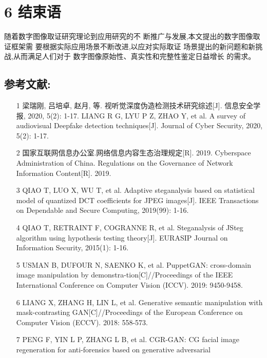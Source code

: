 \documentclass{article}
\begin{document}
\section{6 结束语}

随着数字图像取证研究理论到应用研究的不 断推广与发展,本文提出的数字图像取证框架需 要根据实际应用场景不断改进,以应对实际取证 场景提出的新问题和新挑战,从而满足人们对于 数字图像原始性、真实性和完整性鉴定日益增长 的需求。

\subsection{参考文献:}
\begin{itemize}
\item 
[1] 梁瑞刚, 吕培卓, 赵月, 等. 视听觉深度伪造检测技术研究综述[J]. 信息安全学报, 2020, 5(2): 1-17. LIANG R G, LYU P Z, ZHAO Y, et al. A survey of audiovisual
Deepfake detection techniques[J]. Journal of Cyber Security, 2020, 5(2): 1-17.

\item 
[2] 国家互联网信息办公室.网络信息内容生态治理规定[R]. 2019. Cyberspace Administration of China. Regulations on the Governance of Network Information Content[R]. 2019.

\item 
[3] QIAO T, LUO X, WU T, et al. Adaptive steganalysis based on statistical model of quantized DCT coefficients for JPEG images[J]. IEEE Transactions on Dependable and Secure Computing, 2019(99): 1-16.

\item 
[4] QIAO T, RETRAINT F, COGRANNE R, et al. Steganalysis of JSteg algorithm using hypothesis testing theory[J]. EURASIP Journal on Information Security, 2015(1): 1-16.

\item 
[5] USMAN B, DUFOUR N, SAENKO K, et al. PuppetGAN: cross-domain image manipulation by demonstra-tion[C]//Proceedings of the IEEE International Conference on Computer Vision (ICCV). 2019: 9450-9458.

\item 
[6] LIANG X, ZHANG H, LIN L, et al. Generative semantic manipulation with mask-contrasting GAN[C]//Proceedings of the European Conference on Computer Vision (ECCV). 2018: 558-573.

\item 
[7] PENG F, YIN L P, ZHANG L B, et al. CGR-GAN: CG facial image regeneration for anti-forensics based on generative adversarial

\end{itemize}
\end{document}
